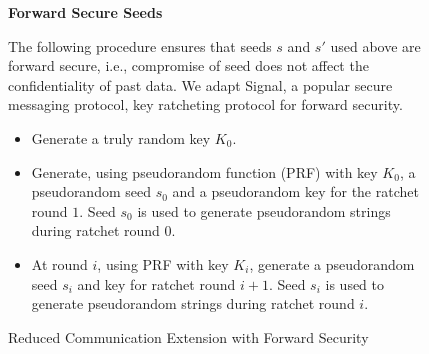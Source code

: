 \begin{figure}
\begin{mdframed}[style=myframe]
\vspace{2pt}

\textbf{Forward Secure Seeds}
\vspace{2pt}

The following procedure ensures that seeds $s$ and $s'$ used above are forward
	secure, i.e., compromise of seed does not affect the confidentiality of past
	data. We adapt Signal, a popular secure messaging protocol, key ratcheting
	protocol for forward security.

\begin{itemize}[leftmargin=*,itemsep=2pt,topsep=2pt]

	\item Generate a truly random key $K_0$.

	\item Generate, using pseudorandom function (PRF) with key $K_0$, a
		pseudorandom seed $s_0$ and a pseudorandom key for the ratchet round $1$.
		Seed $s_0$ is used to generate pseudorandom strings during ratchet round
		$0$.

	\item At round $i$, using PRF with key $K_i$, generate a pseudorandom seed
		$s_i$ and key for ratchet round $i+1$. Seed $s_i$ is used to generate
		pseudorandom strings during ratchet round $i$.

\end{itemize}

\end{mdframed}
\caption{Reduced Communication Extension with Forward Security}
\label{fig:extended_protocol}
\end{figure}
